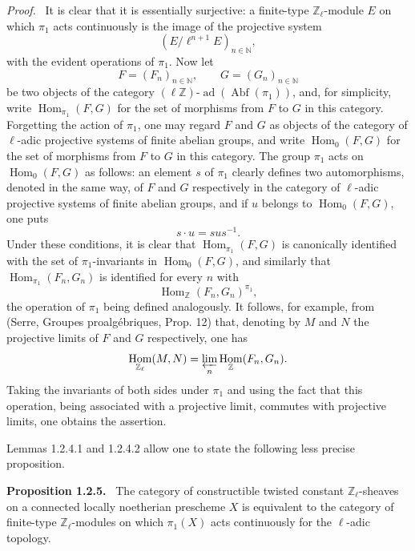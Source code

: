 \documentclass[11pt]{article}
\newenvironment{statement}[1]{\par\medskip\noindent\textbf{#1.}\ }{\par\medskip}
\newenvironment{prooftext}[1][Proof]{\par\noindent\emph{#1.}\ }{\par\medskip}
\DeclareMathOperator{\Hom}{Hom}
\providecommand{\Hom}{\operatorname{Hom}}
\providecommand{\Abf}{\operatorname{Abf}}
\providecommand{\ad}{\operatorname{ad}}
\providecommand{\Hom}{\operatorname{Hom}}
\begin{document}
\begin{prooftext}[Proof]
It is clear that it is essentially surjective: a finite-type \(\mathbb Z_\ell\)-module \(E\) on which \(\pi_1\) acts continuously is the image of the projective system
\[
(E/\ell^{n+1}E)_{n\in\mathbb N},
\]
with the evident operations of \(\pi_1\). Now let
\[
F=(F_n)_{n\in\mathbb N},\qquad G=(G_n)_{n\in\mathbb N}
\]
be two objects of the category \((\ell\mathbb Z)\text{-}\ad(\Abf(\pi_1))\), and, for simplicity, write \(\Hom_{\pi_1}(F,G)\) for the set of morphisms from \(F\) to \(G\) in this category. Forgetting the action of \(\pi_1\), one may regard \(F\) and \(G\) as objects of the category of \(\ell\)-adic projective systems of finite abelian groups, and write \(\Hom_0(F,G)\) for the set of morphisms from \(F\) to \(G\) in this category. The group \(\pi_1\) acts on \(\Hom_0(F,G)\) as follows: an element \(s\) of \(\pi_1\) clearly defines two automorphisms, denoted in the same way, of \(F\) and \(G\) respectively in the category of \(\ell\)-adic projective systems of finite abelian groups, and if \(u\) belongs to \(\Hom_0(F,G)\), one puts
\[
s\cdot u=sus^{-1}.
\]
Under these conditions, it is clear that \(\Hom_{\pi_1}(F,G)\) is canonically identified with the set of \(\pi_1\)-invariants in \(\Hom_0(F,G)\), and similarly that \(\Hom_{\pi_1}(F_n,G_n)\) is identified for every \(n\) with
\[
\Hom_{\mathbb Z}(F_n,G_n)^{\pi_1},
\]
the operation of \(\pi_1\) being defined analogously. It follows, for example, from (Serre, Groupes proalgébriques, Prop. 12) that, denoting by \(M\) and \(N\) the projective limits of \(F\) and \(G\) respectively, one has
\[
\Hom_{\mathbb Z_\ell}(M,N)=\varprojlim_n\Hom_{\mathbb Z}(F_n,G_n).
\]
Taking the invariants of both sides under \(\pi_1\) and using the fact that this operation, being associated with a projective limit, commutes with projective limits, one obtains the assertion.
\end{prooftext}

Lemmas 1.2.4.1 and 1.2.4.2 allow one to state the following less precise proposition.

\begin{statement}{Proposition 1.2.5}
The category of constructible twisted constant \(\mathbb Z_\ell\)-sheaves on a connected locally noetherian prescheme \(X\) is equivalent to the category of finite-type \(\mathbb Z_\ell\)-modules on which \(\pi_1(X)\) acts continuously for the \(\ell\)-adic topology.
\end{statement}
\end{document}
